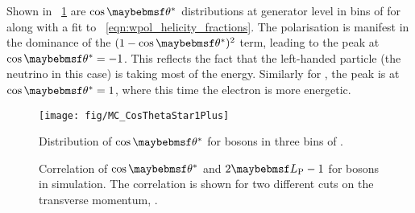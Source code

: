 Shown in \fig~\ref{fig:wpol_costheta} are $\cos\thetastar$ distributions at
generator level in bins of \PtW for \PWp along with a fit to
\eqn~\ref{eqn:wpol_helicity_fractions}. The polarisation is manifest in the
dominance of the $(1-\cos\thetastar)^2$ term, leading to the peak at
$\cos\thetastar = -1$. This reflects the fact that the left-handed particle (the
neutrino in this case) is taking most of the energy. Similarly for \PWm, the
peak is at $\cos\thetastar = 1$, where this time the electron is more energetic.

\begin{figure}
\centering
\texttt{[image: fig/MC\_CosThetaStar1Plus]}
\caption{Distribution of $\cos\thetastar$ for \PWp bosons in three bins of \PtW.}
\label{fig:wpol_costheta}
\end{figure}

\begin{figure}
\centering
{}\quad
\subfloat[[$\PtW > \unit{400}{\GeV}$]{
  \label{fig:wpol_costheta_corr400}\texttt{[image: fig/LP\_corr400]}}\quad
\caption{Correlation of $\cos\thetastar$ and $2\LP - 1$ for \PW bosons in
  simulation. The correlation is shown for two different cuts on the transverse
  momentum, \PtW.}
\label{fig:wpol_costheta_corr}
\end{figure}

